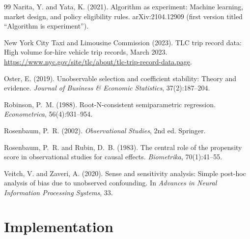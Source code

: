 \documentclass[11pt]{article}
\theoremstyle{remark}
\begin{document}
\begin{thebibliography}{99}
Narita, Y. and Yata, K. (2021).
Algorithm as experiment: Machine learning, market design, and policy eligibility rules.
arXiv:2104.12909 (first version titled ``Algorithm is experiment'').

New York City Taxi and Limousine Commission (2023).
TLC trip record data: High volume for-hire vehicle trip records, March 2023.
\url{https://www.nyc.gov/site/tlc/about/tlc-trip-record-data.page}.

Oster, E. (2019).
Unobservable selection and coefficient stability: Theory and evidence.
\emph{Journal of Business \& Economic Statistics}, 37(2):187--204.

Robinson, P.~M. (1988).
Root-N-consistent semiparametric regression.
\emph{Econometrica}, 56(4):931--954.

Rosenbaum, P.~R. (2002).
\emph{Observational Studies}, 2nd ed.
Springer.

Rosenbaum, P.~R. and Rubin, D.~B. (1983).
The central role of the propensity score in observational studies for causal effects.
\emph{Biometrika}, 70(1):41--55.

Veitch, V. and Zaveri, A. (2020).
Sense and sensitivity analysis: Simple post-hoc analysis of bias due to unobserved confounding.
In \emph{Advances in Neural Information Processing Systems}, 33.

\end{thebibliography}

\appendix

\section{Implementation}
\end{document}
